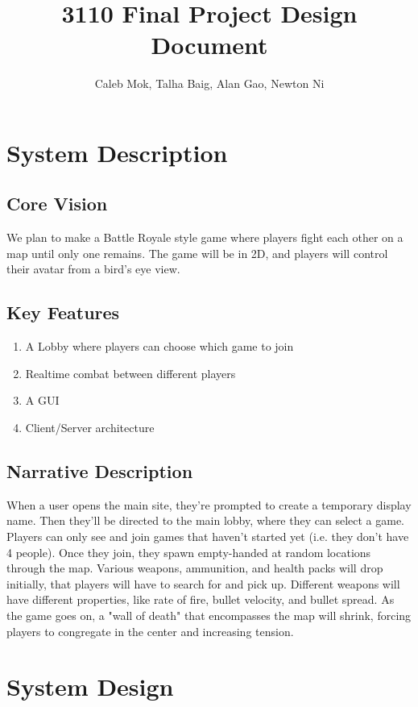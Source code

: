 \documentclass{article}
\author{Caleb Mok, Talha Baig, Alan Gao, Newton Ni}
\title{3110 Final Project Design Document}
\begin{document}
\maketitle

    \section{System Description}

        \subsection{Core Vision}
        We plan to make a Battle Royale style game where players fight each other on a map until only one remains. The game will be in 2D, and players will control their avatar from a bird's eye view.

        \subsection{Key Features}
        \begin{enumerate}
             \item A Lobby where players can choose which game to join
             \item Realtime combat between different players
             \item A GUI
             \item Client/Server architecture
	\end{enumerate}

        \subsection{Narrative Description}
	When a user opens the main site, they're prompted to create a temporary display name. Then they'll be directed to the main lobby, where they can select a game. Players can only see and join games that haven't started yet (i.e. they don't have 4 people). Once they join, they spawn empty-handed at random locations through the map. Various weapons, ammunition, and health packs will drop initially, that players will have to search for and pick up. Different weapons will have different properties, like rate of fire, bullet velocity, and bullet spread. As the game goes on, a "wall of death" that encompasses the map will shrink, forcing players to congregate in the center and increasing tension.

    \section{System Design}
\end{document}
